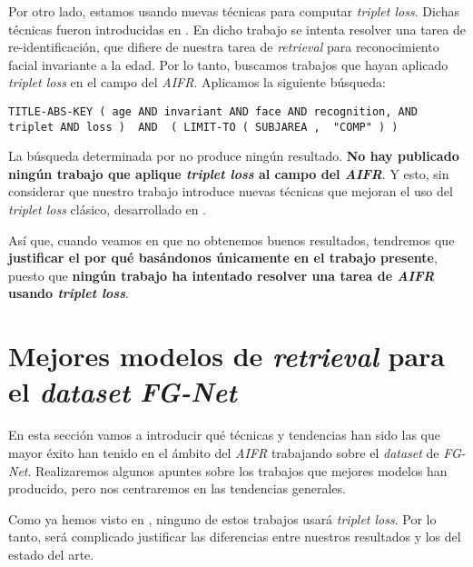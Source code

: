 Por otro lado, estamos usando nuevas técnicas para computar \textit{triplet loss}. Dichas técnicas fueron introducidas en \cite{informatica:principal}. En dicho trabajo se intenta resolver una tarea de re-identificación, que difiere de nuestra tarea de \textit{retrieval} para reconocimiento facial invariante a la edad. Por lo tanto, buscamos trabajos que hayan aplicado \textit{triplet loss} en el campo del \textit{AIFR}. Aplicamos la siguiente búsqueda:

\begin{lstlisting}[caption=Keywords usandos para la búsqueda de trabajos que combinen \textit{AIFR} y \textit{triplet loss} en \textit{SCOPUS}, label=code:scopus_search_especifico, captionpos=b]
    TITLE-ABS-KEY ( age AND invariant AND face AND recognition, AND triplet AND loss )  AND  ( LIMIT-TO ( SUBJAREA ,  "COMP" ) )
\end{lstlisting}

La búsqueda determinada por  no produce ningún resultado. \textbf{No hay publicado ningún trabajo que aplique \textit{triplet loss} al campo del \textit{AIFR}}. Y esto, sin considerar que nuestro trabajo introduce nuevas técnicas que mejoran el uso del \textit{triplet loss} clásico, desarrollado en .

Así que, cuando veamos en  que no obtenemos buenos resultados, tendremos que \textbf{justificar el por qué basándonos únicamente en el trabajo presente}, puesto que \textbf{ningún trabajo ha intentado resolver una tarea de \textit{AIFR} usando \textit{triplet loss}}.

\section{Mejores modelos de \textit{retrieval} para el \textit{dataset} \textit{FG-Net}}

En esta sección vamos a introducir qué técnicas y tendencias han sido las que mayor éxito han tenido en el ámbito del \textit{AIFR} trabajando sobre el \textit{dataset} de \textit{FG-Net}. Realizaremos algunos apuntes sobre los trabajos que mejores modelos han producido, pero nos centraremos en las tendencias generales.

Como ya hemos visto en , ninguno de estos trabajos usará \textit{triplet loss}. Por lo tanto, será complicado justificar las diferencias entre nuestros resultados y los del estado del arte.


